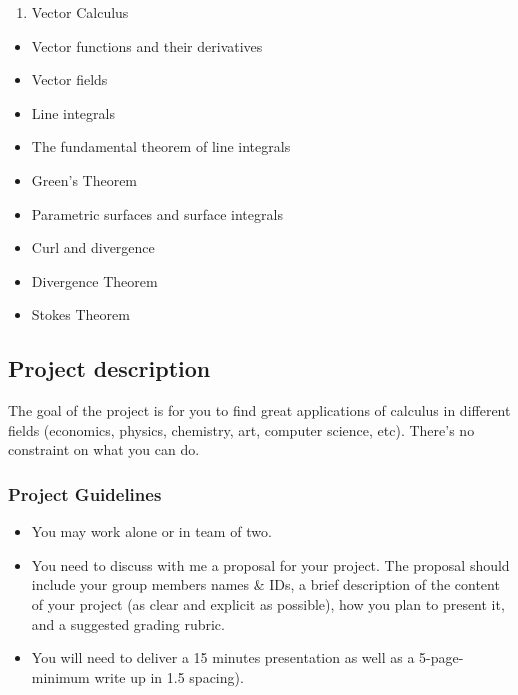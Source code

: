 \documentclass[
]{article}
\providecommand{\tightlist}{%
  \setlength{\itemsep}{0pt}\setlength{\parskip}{0pt}}
\begin{document}
\begin{enumerate}
\def\labelenumi{\arabic{enumi}.}
\setcounter{enumi}{3}
\tightlist
\item
  Vector Calculus
\end{enumerate}

\begin{itemize}
\tightlist
\item
  Vector functions and their derivatives
\item
  Vector fields
\item
  Line integrals
\item
  The fundamental theorem of line integrals
\item
  Green's Theorem
\item
  Parametric surfaces and surface integrals
\item
  Curl and divergence
\item
  Divergence Theorem
\item
  Stokes Theorem
\end{itemize}

\hypertarget{project-description}{%
\subsection*{Project description}\label{project-description}}

The goal of the project is for you to find great applications of calculus
in different fields (economics, physics, chemistry, art, computer science, etc).
There's no constraint on what you can do.

\hypertarget{project-guidelines}{%
\subsubsection*{Project Guidelines}\label{project-guidelines}}

\begin{itemize}
\tightlist
\item
  You may work alone or in team of two.
\item
  You need to discuss with me a proposal for your project.
  The proposal should include your group members names \& IDs, a brief description of the content of your project (as clear and explicit as possible), how you plan to present it, and a suggested grading rubric.
\item
  You will need to deliver a 15 minutes presentation as well as a 5-page-minimum write up in 1.5 spacing).
\end{itemize}
\end{document}
